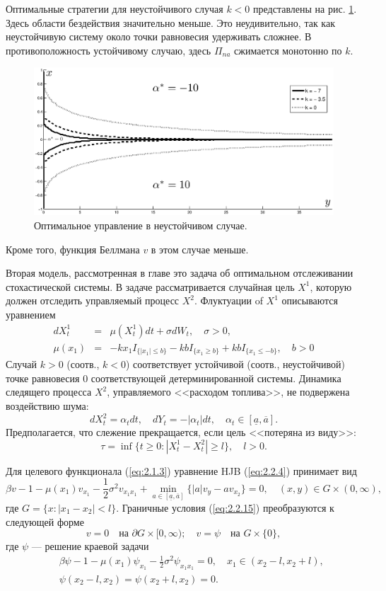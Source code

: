 \documentclass[twoside,12pt]{article}
\begin{document}
Оптимальные стратегии для неустойчивого случая $k<0$  представлены на рис. \ref{fig:2.3}. Здесь области бездействия значительно меньше. Это неудивительно, так как неустойчивую систему около точки равновесия удерживать сложнее. В противоположность устойчивому случаю, здесь $\Pi_{na}$ сжимается монотонно по $k$.
\begin{figure}[ht!]
        \centering
         \includegraphics[width=1\textwidth]{images/control_minus_mu.eps}
        \caption{Оптимальное управление в неустойчивом случае.}
          \label{fig:2.3}
\end{figure}
Кроме того, функция Беллмана $v$ в этом случае меньше.

Вторая модель, рассмотренная в главе это задача об оптимальном отслеживании стохастической системы.
В задаче рассматривается случайная цель $X^1$, которую должен отследить управляемый процесс $X^2$. Флуктуации of $X^1$ описываются уравнением
\begin{eqnarray*}
dX^1_t &=& \mu(X^1_t) dt +\sigma dW_t,\quad \sigma>0,\\
\mu(x_1)&=& -k x_1 I_{\{|x_1|\le b\}} - k b I_{\{x_1\ge b\}}+k b I_{\{x_1\le -b\}},\quad b>0
\end{eqnarray*}
Случай $k>0$ (соотв., $k<0$) соответствует устойчивой (соотв., неустойчивой) точке равновесия $0$ соответствующей детерминированной системы. Динамика следящего процесса $X^2$, управляемого <<расходом топлива>>, не подвержена воздействию шума:
$$ dX^2_t =\alpha_t dt,\quad dY_t =-|\alpha_t|dt,\quad \alpha_t\in [\underline a,\overline a].$$
Предполагается, что слежение прекращается, если цель <<потеряна из виду>>:
$$\tau=\inf\{t\ge 0:|X^1_t- X^2_t|\ge l\},\quad l>0.$$

Для целевого функционала (\ref{eq:2.1.3}) уравнение HJB (\ref{eq:2.2.4}) принимает вид
$$ \beta v-1-\mu(x_1)v_{x_1}-\frac{1}{2}\sigma^2 v_{x_1 x_1}+\min_{a\in [\underline a,\overline a]}\{|a| v_y-a v_{x_2}\}=0,\quad
 (x,y)\in G\times (0,\infty), $$
где $G=\{x:|x_1-x_2|<l\}$. Граничные условия (\ref{eq:2.2.15}) преобразуются к следующей форме
$$ v=0\quad \textrm{на } \partial G\times [0,\infty);\quad v=\psi\quad \textrm{на } G\times\{0\},$$
где $\psi$ --- решение краевой задачи
\begin{eqnarray*}
&&\beta \psi-1-\mu(x_1)\psi_{x_1}-\frac{1}{2}\sigma^2 \psi_{x_1 x_1}=0,\quad x_1\in (x_2-l,x_2+l),\\
&&\psi(x_2-l,x_2)=\psi(x_2+l,x_2)=0.
\end{eqnarray*}
\end{document}

